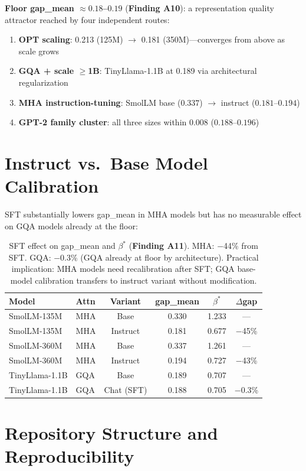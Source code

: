 \documentclass{article}
\begin{document}
\textbf{Floor gap\_mean $\approx 0.18$--$0.19$} (\textbf{Finding A10}): a representation quality attractor reached by four independent routes:
\begin{enumerate}
\item \textbf{OPT scaling}: 0.213 (125M) $\to$ 0.181 (350M)---converges from above as scale grows
\item \textbf{GQA + scale $\geq$1B}: TinyLlama-1.1B at 0.189 via architectural regularization
\item \textbf{MHA instruction-tuning}: SmolLM base ($0.337$) $\to$ instruct ($0.181$--$0.194$)
\item \textbf{GPT-2 family cluster}: all three sizes within 0.008 ($0.188$--$0.196$)
\end{enumerate}

\section{Instruct vs.\ Base Model Calibration}
\label{app:instruct}

SFT substantially lowers gap\_mean in MHA models but has no measurable effect on GQA models already at the floor:

\begin{table}[h]
\centering
\caption{SFT effect on gap\_mean and $\beta^*$ (\textbf{Finding A11}). MHA: $-$44\% from SFT. GQA: $-$0.3\% (GQA already at floor by architecture). Practical implication: MHA models need recalibration after SFT; GQA base-model calibration transfers to instruct variant without modification.}
\begin{tabular}{llcccc}
\toprule
Model & Attn & Variant & gap\_mean & $\beta^*$ & $\Delta$gap \\
\midrule
SmolLM-135M & MHA & Base & 0.330 & 1.233 & --- \\
SmolLM-135M & MHA & Instruct & 0.181 & 0.677 & $-$45\% \\
SmolLM-360M & MHA & Base & 0.337 & 1.261 & --- \\
SmolLM-360M & MHA & Instruct & 0.194 & 0.727 & $-$43\% \\
TinyLlama-1.1B & GQA & Base & 0.189 & 0.707 & --- \\
TinyLlama-1.1B & GQA & Chat (SFT) & 0.188 & 0.705 & $-$0.3\% \\
\bottomrule
\end{tabular}
\end{table}

\section{Repository Structure and Reproducibility}
\label{app:repo}
\end{document}
